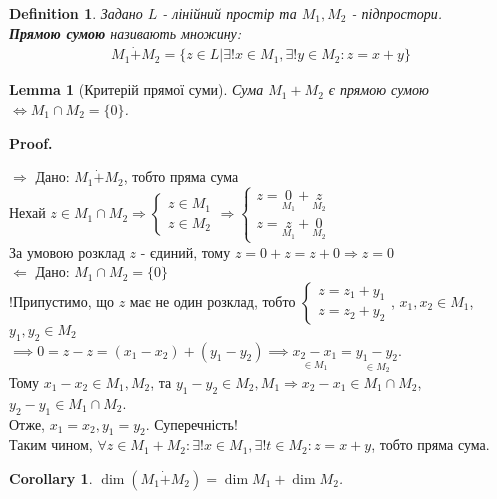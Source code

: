 \documentclass[a4paper, 10pt]{article}
\makeatletter
\def\qed{$\blacksquare$}
\def\rightproof{$\boxed{\Rightarrow}$ }
\def\leftproof{$\boxed{\Leftarrow}$ }
\theoremstyle{theoremdd}
\theoremstyle{theoremdd}
\newtheorem{definition}[theorem]{Definition}
\theoremstyle{theoremdd}
\theoremstyle{theoremdd}
\theoremstyle{theoremdd}
\theoremstyle{theoremdd}
\theoremstyle{theoremdd}
\newtheorem{lemma}[theorem]{Lemma}
\theoremstyle{theoremdd}
\newtheorem{corollary}[theorem]{Corollary}
\renewenvironment{proof}[1][Proof.\\]{\par
\pushQED{\hfill \qed}%
\normalfont \topsep6\p@\@plus6\p@\relax
\trivlist
\item\relax
{\bfseries
#1\@addpunct{.}}\hspace\labelsep\ignorespaces
}{%
\popQED\endtrivlist\@endpefalse
}
\makeatother
\begin{document}
	\begin{definition}
	Задано $L$ - лінійний простір та $M_1, M_2$ - підпростори.\\
	\textbf{Прямою сумою} називають множину:
	\begin{align*}
	M_1 \dot{+} M_2 = \{z \in L | \exists! x \in M_1, \exists! y \in M_2: z = x+y\}
	\end{align*}
	\end{definition}
	
	\begin{lemma}[Критерій прямої суми]
	Сума $M_1 + M_2$ є прямою сумою $\iff M_1 \cap M_2 = \{0\}$.
	\end{lemma}
	
	\begin{proof}
	\rightproof Дано: $M_1 \dot{+} M_2$, тобто пряма сума\\
	Нехай $z \in M_1 \cap M_2 \Rightarrow \begin{cases} z \in M_1 \\ z \in M_2 \end{cases} \Rightarrow \begin{cases} z = \underset{M_1}{0} + \underset{M_2}{z} \\ z = \underset{M_1}{z} + \underset{M_2}{0} \end{cases}$\\
	За умовою розклад $z$ - єдиний, тому $z=0+z=z+0 \Rightarrow z = 0$
	\bigskip \\
	\leftproof Дано: $M_1 \cap M_2 = \{0\}$\\
	!Припустимо, що $z$ має не один розклад, тобто $\begin{cases} z = z_1 + y_1 \\ z = z_2 + y_2 \end{cases}$, $x_1,x_2 \in M_1$, $y_1,y_2 \in M_2$\\
	$\implies 0 = z-z=(x_1-x_2)+(y_1-y_2) \implies \underset{\in M_1}{x_2-x_1}=\underset{\in M_2}{y_1-y_2}$.\\
	Тому $x_1-x_2 \in M_1, M_2$, та $y_1-y_2 \in M_2, M_1 \Rightarrow x_2-x_1 \in M_1 \cap M_2$, $y_2 - y_1 \in M_1 \cap M_2$.\\
	Отже, $x_1 = x_2, y_1 = y_2$. Суперечність! \\
	Таким чином, $\forall z \in M_1 + M_2: \exists! x \in M_1, \exists! t \in M_2: z = x+y$, тобто пряма сума.
	\end{proof}
	
	\begin{corollary}
	$\dim{(M_1 \dot{+} M_2)} = \dim{M_1} + \dim{M_2}$.
	\end{corollary}
	
\end{document}
